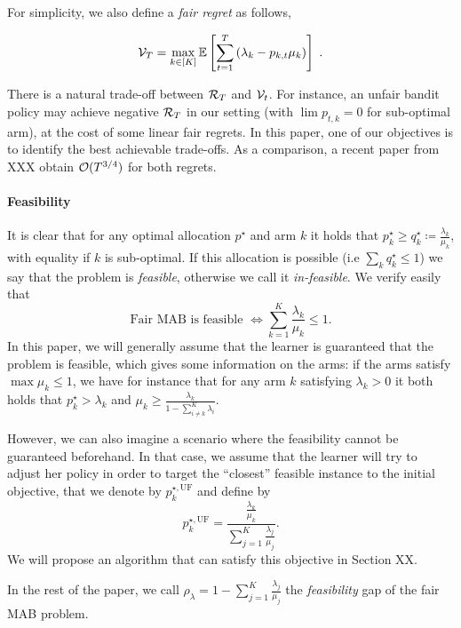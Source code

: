 For simplicity, we also define a \emph{fair regret} as follows, 

\[ \mathcal{V}_T = \max_{k \in [K]} \mathbb{E}\left[\sum_{t=1}^T \left(\lambda_k-p_{k,t} \mu_k \right)\right] \;. \]

There is a natural trade-off between $\mathcal{R}_T$ and $\mathcal{V}_t$. For instance, an unfair bandit policy may achieve negative $\mathcal{R}_T$ in our setting (with $\lim p_{t,k}=0$ for sub-optimal arm), at the cost of some linear fair regrets. In this paper, one of our objectives is to identify the best achievable trade-offs. As a comparison, a recent paper from XXX obtain $\mathcal{O}(T^{3/4})$ for both regrets.


\paragraph{Feasibility} It is clear that for any optimal allocation $p^\star$ and arm $k$ it holds that $p_k^\star\geq q_k^\star \coloneqq \frac{\lambda_k}{\mu_k}$, with equality if $k$ is sub-optimal. If this allocation is possible (i.e $\sum_k q_k^\star\leq 1$) we say that the problem is \emph{feasible}, otherwise we call it \emph{in-feasible}. We verify easily that 
\[\text{Fair MAB is feasible } \Longleftrightarrow \sum_{k=1}^K \frac{\lambda_k}{\mu_k}\leq 1. \]
In this paper, we will generally assume that the learner is guaranteed that the problem is feasible, which gives some information on the arms: if the arms satisfy $\max \mu_k \leq 1$, we have for instance that for any arm $k$ satisfying $\lambda_k>0$ it both holds that $p_k^\star>\lambda_k$ and $\mu_k \geq \frac{\lambda_k}{1-\sum_{i\neq k}^K \lambda_i}$. 

However, we can also imagine a scenario where the feasibility cannot be guaranteed beforehand. In that case, we assume that the learner will try to adjust her policy in order to target the ``closest'' feasible instance to the initial objective, that we denote by $p_k^{\star, \text{UF}}$ and define by  
\[p_k^{\star, \text{UF}}= \frac{\frac{\lambda_k}{\mu_k}}{\sum_{j=1}^K\frac{\lambda_j}{\mu_j}}.\]
We will propose an algorithm that can satisfy this objective in Section XX.

In the rest of the paper, we call $\rho_\lambda = 1-\sum_{j=1}^K\frac{\lambda_j}{\mu_j}$ the \emph{feasibility} gap of the fair MAB problem. 